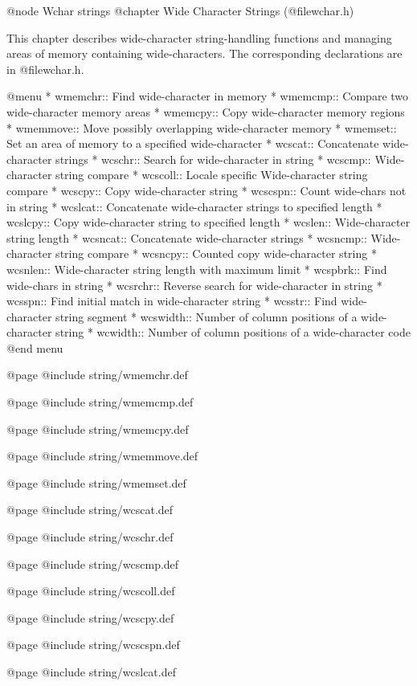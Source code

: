 @node Wchar strings
@chapter Wide Character Strings (@file{wchar.h})

This chapter describes wide-character string-handling functions and
managing areas of memory containing wide-characters.  The corresponding 
declarations are in @file{wchar.h}.

@menu
* wmemchr::     Find wide-character in memory
* wmemcmp::     Compare two wide-character memory areas
* wmemcpy::     Copy wide-character memory regions
* wmemmove::    Move possibly overlapping wide-character memory
* wmemset::     Set an area of memory to a specified wide-character
* wcscat::      Concatenate wide-character strings
* wcschr::      Search for wide-character in string
* wcscmp::      Wide-character string compare
* wcscoll::     Locale specific Wide-character string compare
* wcscpy::      Copy wide-character string
* wcscspn::     Count wide-chars not in string
* wcslcat::     Concatenate wide-character strings to specified length
* wcslcpy::     Copy wide-character string to specified length
* wcslen::      Wide-character string length
* wcsncat::     Concatenate wide-character strings
* wcsncmp::     Wide-character string compare
* wcsncpy::     Counted copy wide-character string
* wcsnlen::     Wide-character string length with maximum limit
* wcspbrk::     Find wide-chars in string
* wcsrchr::     Reverse search for wide-character in string
* wcsspn::      Find initial match in wide-character string
* wcsstr::      Find wide-character string segment
* wcswidth::    Number of column positions of a wide-character string
* wcwidth::     Number of column positions of a wide-character code
@end menu

@page
@include string/wmemchr.def

@page
@include string/wmemcmp.def

@page
@include string/wmemcpy.def

@page
@include string/wmemmove.def

@page
@include string/wmemset.def

@page
@include string/wcscat.def

@page
@include string/wcschr.def

@page
@include string/wcscmp.def

@page
@include string/wcscoll.def

@page
@include string/wcscpy.def

@page
@include string/wcscspn.def

@page
@include string/wcslcat.def

